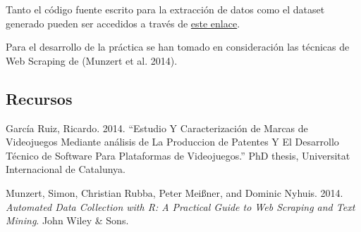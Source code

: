 \documentclass[]{article}
\begin{document}
Tanto el código fuente escrito para la extracción de datos como el
dataset generado pueden ser accedidos a través de
\href{https://github.com/rgarciarui/videogamesScrapper}{este enlace}.

Para el desarrollo de la práctica se han tomado en consideración las
técnicas de Web Scraping de (Munzert et al. 2014).

\clearpage

\subsection*{Recursos}\label{recursos}

\hypertarget{refs}{}
\hypertarget{ref-ruiz2014estudio}{}
García Ruiz, Ricardo. 2014. ``Estudio Y Caracterización de Marcas de
Videojuegos Mediante análisis de La Produccion de Patentes Y El
Desarrollo Técnico de Software Para Plataformas de Videojuegos.''
PhD thesis, Universitat Internacional de Catalunya.

\hypertarget{ref-munzert2014automated}{}
Munzert, Simon, Christian Rubba, Peter Meißner, and Dominic Nyhuis.
2014. \emph{Automated Data Collection with R: A Practical Guide to Web
Scraping and Text Mining}. John Wiley \& Sons.
\end{document}
